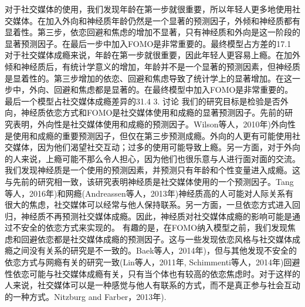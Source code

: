 对于社交媒体的使用，我们发现年龄在第一步就很重要，所以年轻人更多地使用社交媒体。在加入外向和神经质年龄仍然是一个显著的预测因子，外倾和神经质都有显着性。第三步，依恋回避和焦虑的增加不显著，只有神经质和外向是这一阶段的显著预测因子。在最后一步中加入FOMO是非常重要的。最终模型占方差的17.1%
对于社交媒体成瘾来说，年龄在第一步就很重要，因此年轻人更容易上瘾。在加外倾和神经质后，有统计学意义的增加，年龄并不是一个显著的预测因素，但神经质是显着性的。第三步增加的依恋、回避和焦虑导致了统计学上的显著增加。在这一步中，外向、回避和焦虑都是显著的。在最终模型中加入FOMO是非常重要的。最后一个模型占社交媒体成瘾差异的31.4%
3. 讨论
我们的研究目标是检验是否外向，神经质依恋方式和FOMO是社交媒体使用和成瘾的显著预测因子。先前的研究表明，外向性是社交媒体使用和成瘾的预测因子。Wilson等人，2010年)外向性是使用和成瘾的重要预测因子，但仅在第三步预测成瘾。外向的人更有可能使用社交媒体，因为他们渴望社交互动；过多的使用可能导致上瘾。另一方面，对于外向的人来说，上瘾可能不那么令人担心，因为他们也很乐意与人进行面对面的交流。
我们发现神经质是一个使用的预测因素，并预测只有年龄和个性变量进入成瘾。这与先前的研究相一致，该研究表明神经质是社交媒体使用的一个预测因子。Tang等人，2016年)和网瘾(Andreassen等人，2013年)神经质高的人可能对人际关系有很大的焦虑，社交媒体可以经常与他人保持联系。另一方面，一旦依恋方式进入回归，神经质不再预测社交媒体成瘾。因此，神经质对社交媒体成瘾的影响可能是通过不安全的依恋方式来实现的。
有趣的是，在FOMO纳入模型之前，我们发现焦虑和回避依恋都是社交媒体成瘾的预测因子。这与一些发现依恋风格与社交媒体成瘾之间没有关系的研究是不一致的。Baek等人，2014年)，但与其他发现不安全的依恋方式与网瘾有关的研究一致(Lin等人，2011年, Schimmenti等人，2014年)回避性依恋可能与社交媒体成瘾有关，只有当个体也有较高的依恋焦虑时。对于这样的人来说，社交媒体可以是一种感觉与他人有联系的方式，而不是真正参与社会互动的一种方式。Nitzburg and Farber，2013年).
